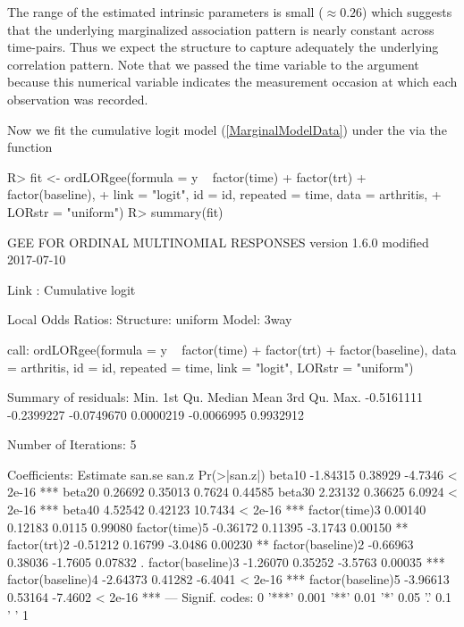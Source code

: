 \documentclass[
]{jss}
\begin{document}
The range of the estimated intrinsic parameters is small
(\(\approx 0.26\)) which suggests that the underlying marginalized
association pattern is nearly constant across time-pairs. Thus we expect
the  structure to capture adequately the underlying
correlation pattern. Note that we passed the time variable to the
 argument because this numerical variable indicates the
measurement occasion at which each observation was recorded.

Now we fit the cumulative logit model (\ref{MarginalModelData}) under
the  via the function 

\begin{CodeChunk}
\begin{CodeInput}
R>  fit <- ordLORgee(formula = y ~ factor(time) + factor(trt) + factor(baseline),
+         link = "logit", id = id, repeated = time, data = arthritis,
+         LORstr = "uniform")
R>  summary(fit)
\end{CodeInput}
\begin{CodeOutput}
GEE FOR ORDINAL MULTINOMIAL RESPONSES 
version 1.6.0 modified 2017-07-10 

Link : Cumulative logit 

Local Odds Ratios:
Structure:         uniform
Model:             3way

call:
ordLORgee(formula = y ~ factor(time) + factor(trt) + factor(baseline), 
    data = arthritis, id = id, repeated = time, link = "logit", 
    LORstr = "uniform")

Summary of residuals:
      Min.    1st Qu.     Median       Mean    3rd Qu.       Max. 
-0.5161111 -0.2399227 -0.0749670  0.0000219 -0.0066995  0.9932912 

Number of Iterations: 5 

Coefficients:
                  Estimate   san.se   san.z Pr(>|san.z|)    
beta10            -1.84315  0.38929 -4.7346      < 2e-16 ***
beta20             0.26692  0.35013  0.7624      0.44585    
beta30             2.23132  0.36625  6.0924      < 2e-16 ***
beta40             4.52542  0.42123 10.7434      < 2e-16 ***
factor(time)3      0.00140  0.12183  0.0115      0.99080    
factor(time)5     -0.36172  0.11395 -3.1743      0.00150 ** 
factor(trt)2      -0.51212  0.16799 -3.0486      0.00230 ** 
factor(baseline)2 -0.66963  0.38036 -1.7605      0.07832 .  
factor(baseline)3 -1.26070  0.35252 -3.5763      0.00035 ***
factor(baseline)4 -2.64373  0.41282 -6.4041      < 2e-16 ***
factor(baseline)5 -3.96613  0.53164 -7.4602      < 2e-16 ***
---
Signif. codes:  0 '***' 0.001 '**' 0.01 '*' 0.05 '.' 0.1 ' ' 1


\end{CodeOutput}
\end{CodeChunk}
\end{document}
